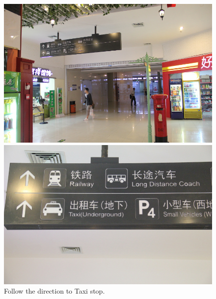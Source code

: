 \documentclass[11pt]{article}
\begin{document}
 \begin{figure}[!h]
	\begin{minipage}[t]{.5\textwidth}
     	\centering
        	\includegraphics[scale=0.27]{IMG_7189.jpg}
	\end{minipage}%
     \begin{minipage}[t]{.5\textwidth}
         \centering
         \includegraphics[scale=0.27]{IMG_7191.jpg}
    \end{minipage}%
    	\caption{Follow the direction to Taxi stop.\label{7191}}
 \end{figure}
\end{document}
